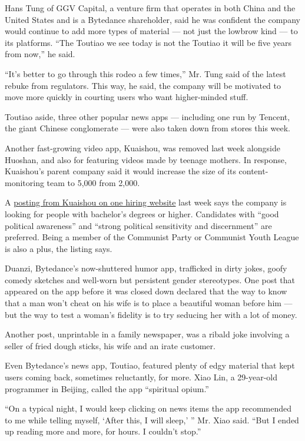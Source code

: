 Hans Tung of GGV Capital, a venture firm that operates in both China and
the United States and is a Bytedance shareholder, said he was confident
the company would continue to add more types of material --- not just
the lowbrow kind --- to its platforms. ``The Toutiao we see today is not
the Toutiao it will be five years from now,'' he said.

``It's better to go through this rodeo a few times,'' Mr. Tung said of
the latest rebuke from regulators. This way, he said, the company will
be motivated to move more quickly in courting users who want
higher-minded stuff.

Toutiao aside, three other popular news apps --- including one run by
Tencent, the giant Chinese conglomerate --- were also taken down from
stores this week.

Another fast-growing video app, Kuaishou, was removed last week
alongside Huoshan, and also for featuring videos made by teenage
mothers. In response, Kuaishou's parent company said it would increase
the size of its content-monitoring team to 5,000 from 2,000.

A \href{https://www.lagou.com/jobs/4377331.html}{posting from Kuaishou
on one hiring website} last week says the company is looking for people
with bachelor's degrees or higher. Candidates with ``good political
awareness'' and ``strong political sensitivity and discernment'' are
preferred. Being a member of the Communist Party or Communist Youth
League is also a plus, the listing says.

Duanzi, Bytedance's now-shuttered humor app, trafficked in dirty jokes,
goofy comedy sketches and well-worn but persistent gender stereotypes.
One post that appeared on the app before it was closed down declared
that the way to know that a man won't cheat on his wife is to place a
beautiful woman before him --- but the way to test a woman's fidelity is
to try seducing her with a lot of money.

Another post, unprintable in a family newspaper, was a ribald joke
involving a seller of fried dough sticks, his wife and an irate
customer.

Even Bytedance's news app, Toutiao, featured plenty of edgy material
that kept users coming back, sometimes reluctantly, for more. Xiao Lin,
a 29-year-old programmer in Beijing, called the app ``spiritual opium.''

``On a typical night, I would keep clicking on news items the app
recommended to me while telling myself, `After this, I will sleep,' ''
Mr. Xiao said. ``But I ended up reading more and more, for hours. I
couldn't stop.''

